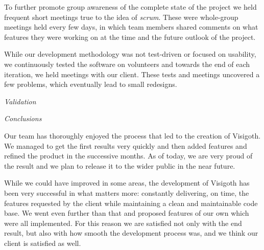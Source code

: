 \documentclass[a4paper,11pt,titlepage]{article}
\begin{document}
\begin{description}
To further promote group awareness of the complete state of the project we held
frequent short meetings true to the idea of \emph{scrum}. These were whole-group
meetings held every few days, in which team members shared comments on what
features they were working on at the time and the future outlook of the project.

While our development methodology was not test-driven or focused on usability, we continuously tested the software on volunteers and towards the end of each iteration,
we held meetings with our client. These tests and meetings uncovered a few 
problems, which eventually lead to small redesigns.

	\item \emph{Validation}

	\item \emph{Conclusions}

Our team has thoroughly enjoyed the process that led to the creation of Visigoth. We managed to get the first results very quickly and then added features and refined the product in the successive months. As of today, we are very proud of the result and we plan to release it to the wider public in the near future.

While we could have improved in some areas, the development of Visigoth has been very successful in what matters more: constantly delivering, on time, the features requested by the client while maintaining a clean and maintainable code base. We went even further than that and proposed features of our own which were all implemented. For this reason we are satisfied not only with the end result, but also with how smooth the development process was, and we think our client is satisfied as well.

\end{description}
\end{document}
